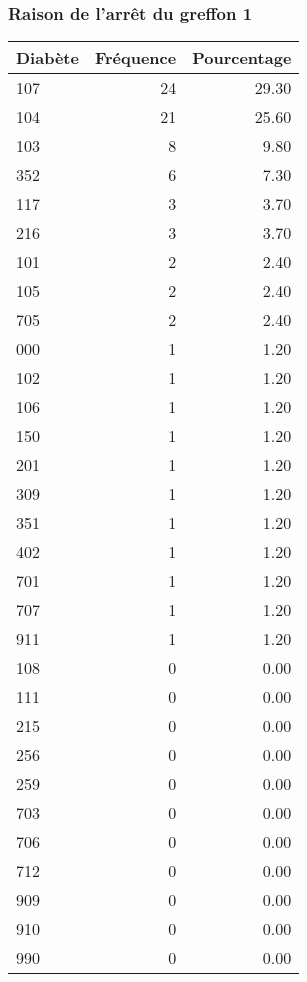\documentclass[11pt,a4paper]{article}\usepackage[]{graphicx}\usepackage[]{color}
\begin{document}
    \subsubsection{Raison de l'arrêt du greffon 1}

\begin{table}[H]
\centering
\begin{tabular}{lrr}
  \hline
Diabète & Fréquence & Pourcentage \\ 
  \hline
107 &  24 & 29.30 \\ 
  104 &  21 & 25.60 \\ 
  103 &   8 & 9.80 \\ 
  352 &   6 & 7.30 \\ 
  117 &   3 & 3.70 \\ 
  216 &   3 & 3.70 \\ 
  101 &   2 & 2.40 \\ 
  105 &   2 & 2.40 \\ 
  705 &   2 & 2.40 \\ 
  000 &   1 & 1.20 \\ 
  102 &   1 & 1.20 \\ 
  106 &   1 & 1.20 \\ 
  150 &   1 & 1.20 \\ 
  201 &   1 & 1.20 \\ 
  309 &   1 & 1.20 \\ 
  351 &   1 & 1.20 \\ 
  402 &   1 & 1.20 \\ 
  701 &   1 & 1.20 \\ 
  707 &   1 & 1.20 \\ 
  911 &   1 & 1.20 \\ 
  108 &   0 & 0.00 \\ 
  111 &   0 & 0.00 \\ 
  215 &   0 & 0.00 \\ 
  256 &   0 & 0.00 \\ 
  259 &   0 & 0.00 \\ 
  703 &   0 & 0.00 \\ 
  706 &   0 & 0.00 \\ 
  712 &   0 & 0.00 \\ 
  909 &   0 & 0.00 \\ 
  910 &   0 & 0.00 \\ 
  990 &   0 & 0.00 \\ 
   \hline
\end{tabular}
\end{table}
\end{document}
